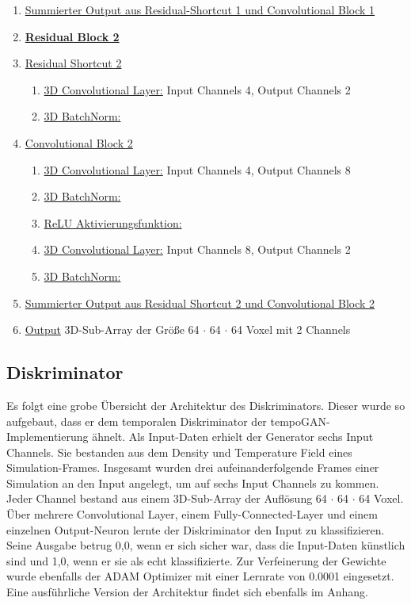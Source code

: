 \begin{enumerate}
    \item \underline{Summierter Output aus Residual-Shortcut 1 und Convolutional Block 1}
    \item \underline{\textbf{Residual Block 2}} 
    \item[] \underline{Residual Shortcut 2} 
        \begin{enumerate}
            \item \underline{3D Convolutional Layer:} Input Channels 4, Output Channels 2
            \item \underline{3D BatchNorm:}
        \end{enumerate}
    \item[] \underline{Convolutional Block 2}
        \begin{enumerate}
            \item \underline{3D Convolutional Layer:} Input Channels 4, Output Channels 8
            \item \underline{3D BatchNorm:}
            \item \underline{ReLU Aktivierungsfunktion:}
            \item \underline{3D Convolutional Layer:} Input Channels 8, Output Channels 2
            \item \underline{3D BatchNorm:}
        \end{enumerate}
    \item \underline{Summierter Output aus Residual Shortcut 2 und Convolutional Block 2}
    \item \underline{Output} 3D-Sub-Array der Größe 64 $\cdot$ 64 $\cdot$ 64 Voxel mit 2 Channels
\end{enumerate}

\subsection{Diskriminator}
Es folgt eine grobe Übersicht der Architektur des Diskriminators. Dieser wurde so aufgebaut, dass er dem temporalen Diskriminator der tempoGAN-Implementierung ähnelt. Als Input-Daten erhielt der Generator sechs Input Channels. Sie bestanden aus dem Density und Temperature Field eines Simulation-Frames. Insgesamt wurden drei aufeinanderfolgende Frames einer Simulation an den Input angelegt, um auf sechs Input Channels zu kommen. Jeder Channel bestand aus einem 3D-Sub-Array der Auflösung 64 $\cdot$ 64 $\cdot$ 64 Voxel. Über mehrere Convolutional Layer, einem Fully-Connected-Layer und einem einzelnen Output-Neuron lernte der Diskriminator den Input zu klassifizieren. Seine Ausgabe betrug 0,0, wenn er sich sicher war, dass die Input-Daten künstlich sind und 1,0, wenn er sie als echt klassifizierte. Zur Verfeinerung der Gewichte wurde ebenfalls der ADAM Optimizer mit einer Lernrate von 0.0001 eingesetzt. Eine ausführliche Version der Architektur findet sich ebenfalls im Anhang.

